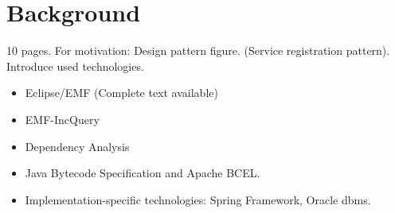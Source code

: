 \chapter{Background}
10 pages. For motivation: Design pattern figure. (Service registration pattern).
Introduce used technologies.
\begin{itemize}
	\item Eclipse/EMF (Complete text available)
	\item EMF-IncQuery
	\item Dependency Analysis
	\item Java Bytecode Specification and Apache BCEL.
	\item Implementation-specific technologies: Spring Framework, Oracle dbms.
\end{itemize}
